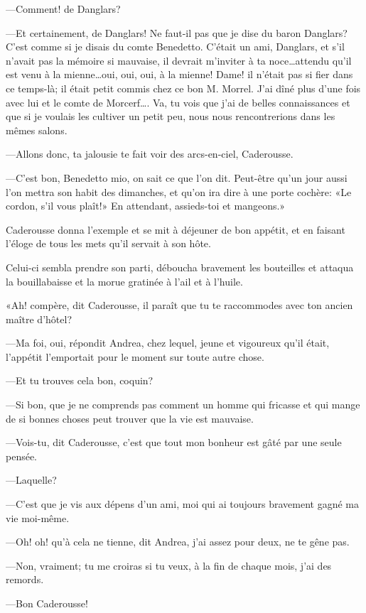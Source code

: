 —Comment! de Danglars? 

—Et certainement, de Danglars! Ne faut-il pas que je dise du baron Danglars? C'est comme si je disais du comte Benedetto. C'était un ami, Danglars, et s'il n'avait pas la mémoire si mauvaise, il devrait m'inviter à ta noce\dots attendu qu'il est venu à la mienne\dots oui, oui, oui, à la mienne! Dame! il n'était pas si fier dans ce temps-là; il était petit commis chez ce bon M. Morrel. J'ai dîné plus d'une fois avec lui et le comte de Morcerf\dots. Va, tu vois que j'ai de belles connaissances et que si je voulais les cultiver un petit peu, nous nous rencontrerions dans les mêmes salons. 

—Allons donc, ta jalousie te fait voir des arcs-en-ciel, Caderousse. 

—C'est bon, Benedetto mio, on sait ce que l'on dit. Peut-être qu'un jour aussi l'on mettra son habit des dimanches, et qu'on ira dire à une porte cochère: «Le cordon, s'il vous plaît!» En attendant, assieds-toi et mangeons.» 

Caderousse donna l'exemple et se mit à déjeuner de bon appétit, et en faisant l'éloge de tous les mets qu'il servait à son hôte. 

Celui-ci sembla prendre son parti, déboucha bravement les bouteilles et attaqua la bouillabaisse et la morue gratinée à l'ail et à l'huile. 

«Ah! compère, dit Caderousse, il paraît que tu te raccommodes avec ton ancien maître d'hôtel? 

—Ma foi, oui, répondit Andrea, chez lequel, jeune et vigoureux qu'il était, l'appétit l'emportait pour le moment sur toute autre chose. 

—Et tu trouves cela bon, coquin? 

—Si bon, que je ne comprends pas comment un homme qui fricasse et qui mange de si bonnes choses peut trouver que la vie est mauvaise. 

—Vois-tu, dit Caderousse, c'est que tout mon bonheur est gâté par une seule pensée. 

—Laquelle? 

—C'est que je vis aux dépens d'un ami, moi qui ai toujours bravement gagné ma vie moi-même. 

—Oh! oh! qu'à cela ne tienne, dit Andrea, j'ai assez pour deux, ne te gêne pas. 

—Non, vraiment; tu me croiras si tu veux, à la fin de chaque mois, j'ai des remords. 

—Bon Caderousse! 

